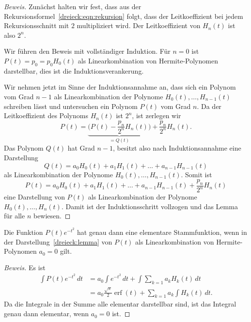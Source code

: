 \begin{proof}[Beweis]
Zunächst halten wir fest, dass aus der
Rekursionsformel~\eqref{dreieck:eqn:rekursion}
folgt, dass der Leitkoeffizient bei jedem Rekursionsschnitt
mit $2$ multipliziert wird.
Der Leitkoeffizient von $H_n(t)$ ist also $2^n$.
%

Wir führen den Beweis mit vollständiger Induktion.
%
%
Für $n=0$ ist $P(t)=p_0 = p_0 H_0(t)$ als Linearkombination von
Hermite-Polynomen darstellbar, dies ist die Induktionsverankerung.

Wir nehmen jetzt im Sinne der Induktionsannahme an,
dass sich ein Polynom vom Grad $n-1$ als
Linearkombination der Polynome $H_0(t),\dots,H_{n-1}(t)$ schreiben
lässt und untersuchen ein Polynom $P(t)$ vom Grad $n$.
Da der Leitkoeffizient des Polynoms $H_n(t)$ ist $2^n$, ist zerlegen
wir
\[
P(t)
=
\underbrace{\biggl(P(t) - \frac{p_n}{2^n} H_n(t)\biggr)}_{\displaystyle = Q(t)}
+
\frac{p_n}{2^n} H_n(t).
\]
Das Polynom $Q(t)$ hat Grad $n-1$, besitzt also nach Induktionsannahme
eine Darstellung
\[
Q(t) = a_0H_0(t)+a_1H_1(t)+\ldots+a_{n-1}H_{n-1}(t)
\]
als Linearkombination der Polynome $H_0(t),\dots,H_{n-1}(t)$.
Somit ist
\[
P(t)
= a_0H_0(t)+a_1H_1(t)+\ldots+a_{n-1}H_{n-1}(t) +
\frac{p_n}{2^n} H_n(t)
\]
eine Darstellung von $P(t)$ als Linearkombination der Polynome
$H_0(t),\dots,H_n(t)$.
Damit ist der Induktionsschritt vollzogen und das Lemma für alle
$n$ bewiesen.
\end{proof}

\begin{satz}
\label{dreieck:satz1}
Die Funktion $P(t)e^{-t^2}$ hat genau dann eine elementare Stammfunktion,
wenn in der Darstellung~\eqref{dreieck:lemma}
von $P(t)$ als Linearkombination von Hermite-Polynomen $a_0=0$ gilt.
\end{satz}

\begin{proof}[Beweis]
Es ist
\begin{align*}
\int P(t)e^{-t^2}\,dt
&=
a_0\int e^{-t^2}\,dt
+
\int
\sum_{k=1} a_kH_k(t)\,dt
\\
&=
a_0
\frac{\sqrt{\pi}}2
\operatorname{erf}(t)
+
\sum_{k=1} a_k\int H_k(t)\,dt.
\end{align*}
Da die Integrale in der Summe alle elementar darstellbar sind,
ist das Integral genau dann elementar, wenn $a_0=0$ ist.
\end{proof}


